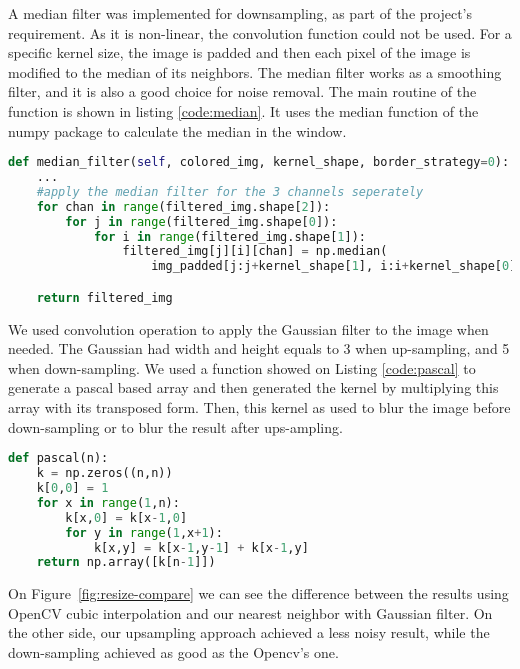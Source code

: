 \documentclass[]{IEEEtran}
\begin{document}
 A median filter was implemented for downsampling, as part of the project's requirement. As it is non-linear, the convolution function could not be used. For a specific kernel size, the image is padded and then each pixel of the image is modified to the median of its neighbors. The median filter works as a smoothing filter, and it is also a good choice for noise removal.
 The main routine of the function is shown in listing \ref{code:median}. It uses the median function of the numpy package to calculate the median in the window.
 
  \begin{lstlisting}[language=Python, caption={Main routine of median filter function}, label={code:median}]
def median_filter(self, colored_img, kernel_shape, border_strategy=0):    
    ...
    #apply the median filter for the 3 channels seperately
    for chan in range(filtered_img.shape[2]):
        for j in range(filtered_img.shape[0]):
            for i in range(filtered_img.shape[1]):
                filtered_img[j][i][chan] = np.median(
                    img_padded[j:j+kernel_shape[1], i:i+kernel_shape[0], chan])

    return filtered_img
\end{lstlisting}
 
 We used convolution operation to apply the Gaussian filter to the image when needed. The Gaussian had width and height equals to 3 when up-sampling, and 5 when down-sampling. We used a function showed on Listing \ref{code:pascal} to generate a pascal based array and then generated the kernel by multiplying this array with its transposed form. Then, this kernel as used to blur the image before down-sampling or to blur the result after ups-ampling.
 \begin{lstlisting}[language=Python, caption={Pascal array generator to generate Gaussian masks}, label={code:pascal}]
def pascal(n):
    k = np.zeros((n,n))
    k[0,0] = 1
    for x in range(1,n):
        k[x,0] = k[x-1,0]
        for y in range(1,x+1):
            k[x,y] = k[x-1,y-1] + k[x-1,y]
    return np.array([k[n-1]])
\end{lstlisting}
On Figure~\ref{fig:resize-compare} we can see the difference between the results using OpenCV cubic interpolation and our nearest neighbor with Gaussian filter. On the other side, our upsampling approach achieved a less noisy result, while the down-sampling achieved as good as the Opencv's one.

\end{document}
